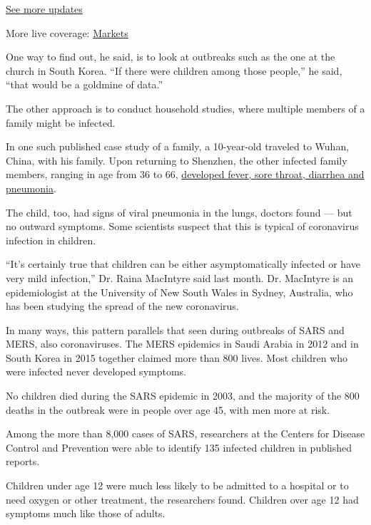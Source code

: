 \href{https://www.nytimes.com/2020/08/01/world/coronavirus-covid-19.html?action=click\&pgtype=Article\&state=default\&region=MAIN_CONTENT_1\&context=storylines_live_updates}{See
more updates}

More live coverage:
\href{https://www.nytimes.com/live/2020/07/31/business/stock-market-today-coronavirus?action=click\&pgtype=Article\&state=default\&region=MAIN_CONTENT_1\&context=storylines_live_updates}{Markets}

One way to find out, he said, is to look at outbreaks such as the one at
the church in South Korea. ``If there were children among those
people,'' he said, ``that would be a goldmine of data.''

The other approach is to conduct household studies, where multiple
members of a family might be infected.

In one such published case study of a family, a 10-year-old traveled to
Wuhan, China, with his family. Upon returning to Shenzhen, the other
infected family members, ranging in age from 36 to 66,
\href{https://www.thelancet.com/journals/lancet/article/PIIS0140-6736(20)30154-9/fulltext}{developed
fever, sore throat, diarrhea and pneumonia}.

The child, too, had signs of viral pneumonia in the lungs, doctors found
--- but no outward symptoms. Some scientists suspect that this is
typical of coronavirus infection in children.

``It's certainly true that children can be either asymptomatically
infected or have very mild infection,'' Dr. Raina MacIntyre said last
month. Dr. MacIntyre is an epidemiologist at the University of New South
Wales in Sydney, Australia, who has been studying the spread of the new
coronavirus.

In many ways, this pattern parallels that seen during outbreaks of SARS
and MERS, also coronaviruses. The MERS epidemics in Saudi Arabia in 2012
and in South Korea in 2015 together claimed more than 800 lives. Most
children who were infected never developed symptoms.

No children died during the SARS epidemic in 2003, and the majority of
the 800 deaths in the outbreak were in people over age 45, with men more
at risk.

Among the more than 8,000 cases of SARS, researchers at the Centers for
Disease Control and Prevention were able to identify 135 infected
children in published reports.

Children under age 12 were much less likely to be admitted to a hospital
or to need oxygen or other treatment, the researchers found. Children
over age 12 had symptoms much like those of adults.

